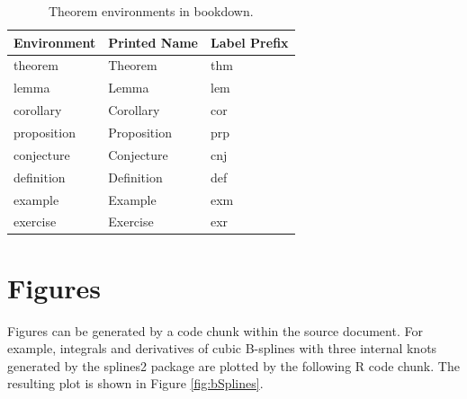 \documentclass[11pt,letterpaper,]{article}
\newcommand{\pkg}[1]{{\normalfont\fontseries{b}\selectfont #1}}
\let\proglang=\textsf
\theoremstyle{definition}
\theoremstyle{definition}
\theoremstyle{definition}
\theoremstyle{remark}
\begin{document}
\begin{table}

\caption{\label{tab:theorem-envs}Theorem environments in \pkg{bookdown}.}
\centering
\begin{tabular}[t]{lll}
\toprule
Environment & Printed Name & Label Prefix\\
\midrule
theorem & Theorem & thm\\
lemma & Lemma & lem\\
corollary & Corollary & cor\\
proposition & Proposition & prp\\
conjecture & Conjecture & cnj\\
\addlinespace
definition & Definition & def\\
example & Example & exm\\
exercise & Exercise & exr\\
\bottomrule
\end{tabular}
\end{table}

\hypertarget{sec:figure}{%
\section{Figures}\label{sec:figure}}

Figures can be generated by a code chunk within the source document. For
example, integrals and derivatives of cubic B-splines with three
internal knots generated by the \pkg{splines2} package
\citep{wang2017splines2} are plotted by the following \proglang{R} code
chunk. The resulting plot is shown in Figure \ref{fig:bSplines}.
\end{document}
